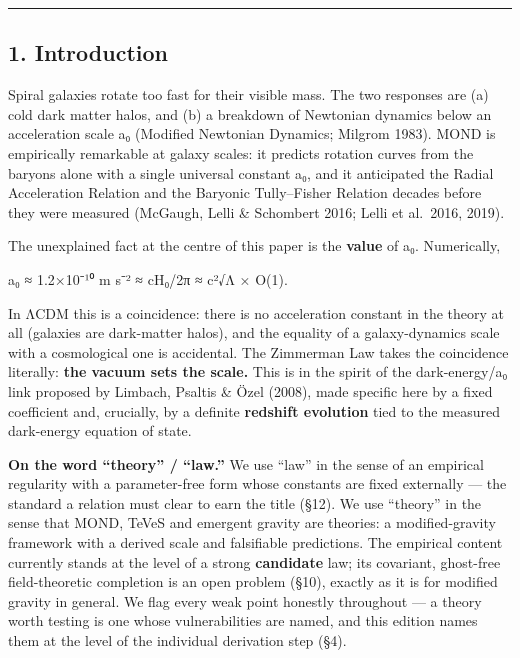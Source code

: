 \documentclass[
]{article}
\begin{document}
\begin{center}\rule{0.5\linewidth}{0.5pt}\end{center}

\subsection{1. Introduction}\label{introduction}

Spiral galaxies rotate too fast for their visible mass. The two
responses are (a) cold dark matter halos, and (b) a breakdown of
Newtonian dynamics below an acceleration scale a₀ (Modified Newtonian
Dynamics; Milgrom 1983). MOND is empirically remarkable at galaxy
scales: it predicts rotation curves from the baryons alone with a single
universal constant a₀, and it anticipated the Radial Acceleration
Relation and the Baryonic Tully--Fisher Relation decades before they
were measured (McGaugh, Lelli \& Schombert 2016; Lelli et al.~2016,
2019).

The unexplained fact at the centre of this paper is the \textbf{value}
of a₀. Numerically,

a₀ ≈ 1.2×10⁻¹⁰ m s⁻² ≈ cH₀/2π ≈ c²√Λ × O(1).

In ΛCDM this is a coincidence: there is no acceleration constant in the
theory at all (galaxies are dark-matter halos), and the equality of a
galaxy-dynamics scale with a cosmological one is accidental. The
Zimmerman Law takes the coincidence literally: \textbf{the vacuum sets
the scale.} This is in the spirit of the dark-energy/a₀ link proposed by
Limbach, Psaltis \& Özel (2008), made specific here by a fixed
coefficient and, crucially, by a definite \textbf{redshift evolution}
tied to the measured dark-energy equation of state.

\textbf{On the word ``theory'' / ``law.''} We use ``law'' in the sense
of an empirical regularity with a parameter-free form whose constants
are fixed externally --- the standard a relation must clear to earn the
title (§12). We use ``theory'' in the sense that MOND, TeVeS and
emergent gravity are theories: a modified-gravity framework with a
derived scale and falsifiable predictions. The empirical content
currently stands at the level of a strong \textbf{candidate} law; its
covariant, ghost-free field-theoretic completion is an open problem
(§10), exactly as it is for modified gravity in general. We flag every
weak point honestly throughout --- a theory worth testing is one whose
vulnerabilities are named, and this edition names them at the level of
the individual derivation step (§4).
\end{document}
